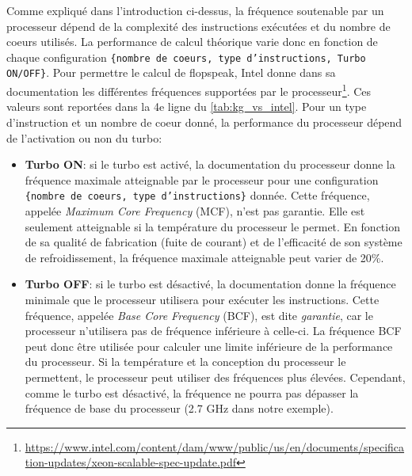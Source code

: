     Comme expliqué dans l'introduction ci-dessus, la fréquence  soutenable par un processeur dépend de la complexité des instructions exécutées et du nombre de coeurs utilisés. La performance de calcul théorique varie donc en fonction de chaque configuration \texttt{\{nombre de coeurs, type d'instructions, Turbo ON/OFF\}}. Pour permettre le calcul de \gls{flopspeak}, Intel donne dans sa documentation les différentes fréquences supportées par le processeur\footnote{\url{https://www.intel.com/content/dam/www/public/us/en/documents/specification-updates/xeon-scalable-spec-update.pdf}}. Ces valeurs sont reportées dans la 4e ligne du \autoref{tab:kg_vs_intel}. Pour un type d'instruction et un nombre de coeur donné, la performance du processeur dépend de l'activation ou non du turbo:
    \begin{itemize}
        
        
        \item \textbf{Turbo ON}: si le turbo est activé, la documentation du processeur donne la fréquence maximale atteignable par le processeur pour une configuration \texttt{\{nombre de coeurs, type d'instructions\}} donnée. Cette fréquence, appelée \textit{Maximum Core Frequency} (MCF), n'est pas garantie. Elle est seulement atteignable si la température du processeur le permet. En fonction de sa qualité de fabrication (fuite de courant) et de l'efficacité de son système de refroidissement, la fréquence maximale atteignable peut varier de 20\%.
        
        \item \textbf{Turbo OFF}: si le turbo est désactivé, la documentation donne la fréquence minimale que le processeur utilisera pour exécuter les instructions. Cette fréquence, appelée \textit{Base Core Frequency} (BCF), est dite \textit{garantie}, car le processeur n'utilisera pas de fréquence inférieure à celle-ci.  La fréquence BCF peut donc être utilisée pour calculer une limite inférieure de la performance du processeur. Si la température et la conception du processeur le permettent, le processeur peut utiliser des fréquences plus élevées. Cependant, comme le turbo est désactivé, la fréquence ne pourra pas dépasser la fréquence de base du processeur (2.7 GHz dans notre exemple).
        
    \end{itemize}
    
